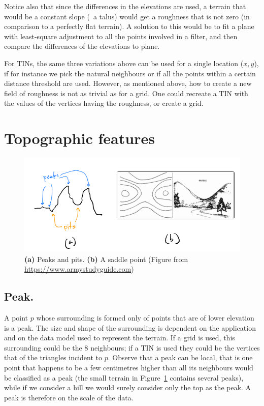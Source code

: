 Notice also that since the differences in the elevations are used, a terrain that would be a constant slope (\eg\ a talus) would get a roughness that is not zero (in comparison to a perfectly flat terrain).
A solution to this would be to fit a plane with least-square adjustment to all the points involved in a filter, and then compare the differences of the elevations to plane.

%

For TINs, the same three variations above can be used for a single location ($x,y$), if for instance we pick the natural neighbours or if all the points within a certain distance threshold are used.
However, as mentioned above, how to create a new field of roughness is not as trivial as for a grid.
One could recreate a TIN with the values of the vertices having the roughness, or create a grid.




%
\section{Topographic features}

\begin{figure}
  \centering
  \includegraphics[width=\linewidth]{figs/feature_points}
  \caption{\textbf{(a)} Peaks and pits. \textbf{(b)} A saddle point (Figure from \url{https://www.armystudyguide.com})}%
\label{fig:feature_points}
\end{figure}


\subsection{Peak.}
A point $p$ whose surrounding is formed only of points that are of lower elevation is a peak.
The size and shape of the surrounding is dependent on the application and on the data model used to represent the terrain.
If a grid is used, this surrounding could be the 8 neighbours; if a TIN is used they could be the vertices that of the triangles incident to $p$.
Observe that a peak can be local,%
that is one point that happens to be a few centimetres higher than all its neighbours would be classified as a peak (the small terrain in Figure~\ref{fig:feature_points} contains several peaks), while if we consider a hill we would surely consider only the top as the peak.
A peak is therefore on the scale of the data.

